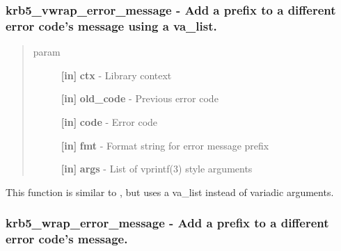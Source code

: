 \documentclass[letterpaper,10pt,english]{sphinxmanual}
\begin{document}
\subsubsection{krb5\_vwrap\_error\_message -  Add a prefix to a different error code's message using a va\_list.}
\label{appdev/refs/api/krb5_vwrap_error_message:krb5-vwrap-error-message-add-a-prefix-to-a-different-error-code-s-message-using-a-va-list}\label{appdev/refs/api/krb5_vwrap_error_message::doc}

\begin{fulllineitems}
\label{appdev/refs/api/krb5_vwrap_error_message:c.krb5_vwrap_error_message}
\end{fulllineitems}

\begin{quote}\begin{description}
\item[{param}] \leavevmode
\textbf{{[}in{]}} \textbf{ctx} - Library context

\textbf{{[}in{]}} \textbf{old\_code} - Previous error code

\textbf{{[}in{]}} \textbf{code} - Error code

\textbf{{[}in{]}} \textbf{fmt} - Format string for error message prefix

\textbf{{[}in{]}} \textbf{args} - List of vprintf(3) style arguments

\end{description}\end{quote}

This function is similar to {\hyperref[appdev/refs/api/krb5_wrap_error_message:c.krb5_wrap_error_message]{}} , but uses a va\_list instead of variadic arguments.


\subsubsection{krb5\_wrap\_error\_message -  Add a prefix to a different error code's message.}
\label{appdev/refs/api/krb5_wrap_error_message:krb5-wrap-error-message-add-a-prefix-to-a-different-error-code-s-message}\label{appdev/refs/api/krb5_wrap_error_message::doc}
\end{document}
